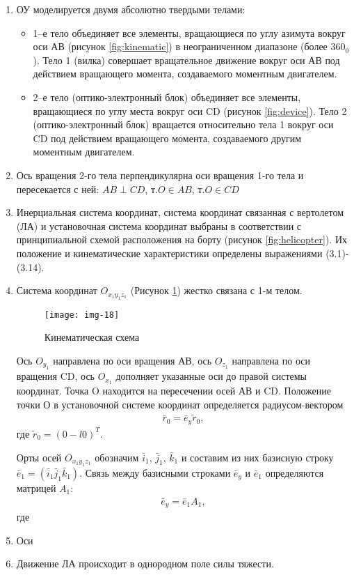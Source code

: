 \begin{enumerate}
	\item ОУ моделируется двумя абсолютно твердыми телами:
	\begin{itemize}
		\item 1–е тело объединяет все элементы, вращающиеся по углу азимута вокруг оси АВ (рисунок \ref{fig:kinematic}) в неограниченном диапазоне (более $360_0$). Тело 1 (вилка) совершает вращательное движение вокруг оси АВ под действием вращающего момента, создаваемого моментным двигателем.
		\item 2–е тело (оптико-электронный блок) объединяет все элементы, вращающиеся по углу места вокруг оси CD (рисунок \ref{fig:device}). Тело 2 (оптико-электронный блок) вращается относительно тела 1 вокруг оси CD под действием вращающего момента, создаваемого другим моментным двигателем.
	\end{itemize}
	\item Ось вращения 2-го тела перпендикулярна оси вращения 1-го тела и пересекается с ней: $AB\perp CD$, т.$O \in AB$, т.$O \in CD$
	\item Инерциальная система координат, система координат связанная с вертолетом (ЛА) и установочная система координат выбраны в соответствии с принципиальной схемой расположения на борту (рисунок \ref{fig:helicopter}). Их положение и кинематические характеристики  определены выражениями (3.1)-(3.14).
	\item Система координат $O_{x_1y_1z_1}$ (Рисунок \ref{fig:coord/3.4}) жестко связана с 1-м телом. 
	\begin{figure}[ht]
		\centering
		\texttt{[image: img-18]} 
		\caption{Кинематическая схема}
		\label{fig:coord/3.4}
	\end{figure}

	Ось $O_{y_1}$ направлена по оси вращения АВ, ось $O_{z_1}$ направлена по оси вращения CD, ось $O_{x_1}$ дополняет указанные оси до правой системы координат. Точка O находится на пересечении осей АВ и CD. Положение точки О в установочной системе координат определяется радиусом-вектором
	\begin{equation}
	\label{eq:p3:1}
	\begin{alignedat}{2}
	\bar{r}_0 = \bar{e}_y\tilde{r}_0 ,
	\end{alignedat}
	\end{equation}
	где $\tilde{r}_0 = (0 -l 0)^T$.
	
	Орты осей $O_{x_1y_1z_1}$ обозначим $\bar{i}_1$, $\bar{j}_1$, $\bar{k}_1$ и составим из них базисную строку $\bar{e}_1 = (\bar{i}_1 \bar{j}_1 \bar{k}_1)$. Связь между базисными строками $\bar{e}_y$ и $\bar{e}_1$ определяются матрицей $A_1$:
	\begin{equation}
	\label{eq:p3:2}
	\begin{alignedat}{2}
	\bar{e}_y = \bar{e}_1	A_1 ,
	\end{alignedat}
	\end{equation}
	где 
	
	\item Оси
	\item Движение ЛА происходит в однородном поле силы тяжести.
\end{enumerate}


